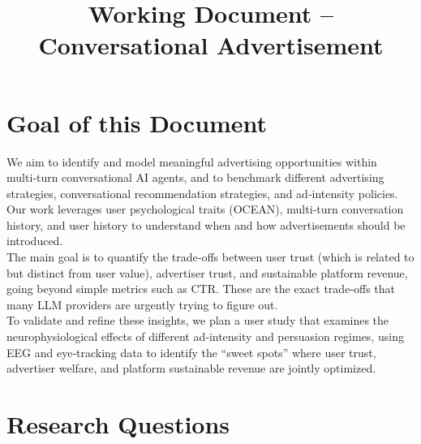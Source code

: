 \documentclass{article}
\title{Working Document -- Conversational Advertisement}
\author{}
\date{}
\begin{document}
\maketitle

\section{Goal of this Document}

We aim to identify and model meaningful advertising opportunities within multi‑turn conversational AI agents, and to benchmark different advertising strategies, conversational recommendation strategies, and ad‑intensity policies. Our work leverages user psychological traits (OCEAN), multi‑turn conversation history, and user history to understand when and how advertisements should be introduced.
\\ 

The main goal is to quantify the trade‑offs between user trust (which is related to but distinct from user value), advertiser trust, and sustainable platform revenue, going beyond simple metrics such as CTR. These are the exact trade‑offs that many LLM providers are urgently trying to figure out.
\\

To validate and refine these insights, we plan a user study that examines the neurophysiological effects of different ad‑intensity and persuasion regimes, using EEG and eye‑tracking data to identify the “sweet spots” where user trust, advertiser welfare, and platform sustainable revenue are jointly optimized.

\section{Research Questions}
\end{document}
